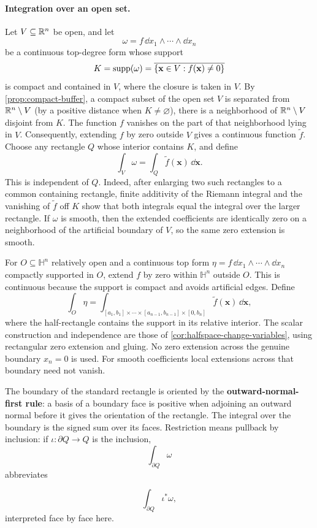 \paragraph{Integration over an open set.}
Let \(V\subseteq\mathbb{R}^n\) be open, and let
\[
\omega=f\,\dd x_1\wedge\cdots\wedge\dd x_n
\]
be a continuous top-degree form whose support
\[
K=\operatorname{supp}(\omega)
=\overline{\left\{\mathbf{x}\in V:f(\mathbf{x})\ne0\right\}}
\]
is compact and contained in \(V\), where the closure is taken in \(V\).
By \cref{prop:compact-buffer}, a compact subset of the open set \(V\) is separated from
\(\mathbb{R}^n\setminus V\) (by a positive distance when \(K\ne\varnothing\)), there
is a neighborhood of \(\mathbb{R}^n\setminus V\) disjoint from \(K\).  The function
\(f\) vanishes on the part of that neighborhood lying in \(V\).  Consequently,
extending \(f\) by zero outside \(V\) gives a continuous function
\(\widetilde f\).  Choose any rectangle \(Q\) whose interior contains \(K\),
and define
\[
\int_V\omega=\int_Q\widetilde f(\mathbf{x})\,\dd\mathbf{x}.
\]
This is independent of \(Q\).  Indeed, after enlarging two such rectangles
to a common containing rectangle, finite additivity of the Riemann integral
and the vanishing of \(\widetilde f\) off \(K\) show that both integrals
equal the integral over the larger rectangle.  If \(\omega\) is smooth, then
the extended coefficients are identically zero on a neighborhood of the
artificial boundary of \(V\), so the same zero extension is smooth.

\begin{definition}
\label{def:halfspace-form-integral}
For $O\subseteq\mathbb H^n$ relatively open and a continuous top form
$\eta=f\,\dd x_1\wedge\cdots\wedge\dd x_n$ compactly supported in $O$,
extend $f$ by zero within $\mathbb H^n$ outside $O$. This is continuous
because the support is compact and avoids artificial edges. Define
\[
\int_O\eta=\int_{[a_1,b_1]\times\cdots\times[a_{n-1},b_{n-1}]\times[0,b_n]}
\widetilde f(\mathbf{x})\,\dd\mathbf{x},
\]
where the half-rectangle contains the support in its relative interior.
The scalar construction and independence are those of
\cref{cor:halfspace-change-variables}, using rectangular zero extension
and gluing. No zero extension across the genuine boundary $x_n=0$ is used.
For smooth coefficients local extensions across that boundary need not vanish.
\end{definition}

\begin{definition}
The boundary of the standard rectangle is oriented by the
\textbf{outward-normal-first rule}: a basis of a boundary face is positive
when adjoining an outward normal before it gives the orientation of the
rectangle.  The integral over the boundary is the signed sum over its faces.
Restriction means pullback by inclusion: if $\iota:\partial Q\to Q$ is
the inclusion,
\[
\int_{\partial Q}\omega
\]
 abbreviates

\[
\int_{\partial Q}\iota^*\omega,
\]
 interpreted face by face here.
\end{definition}

